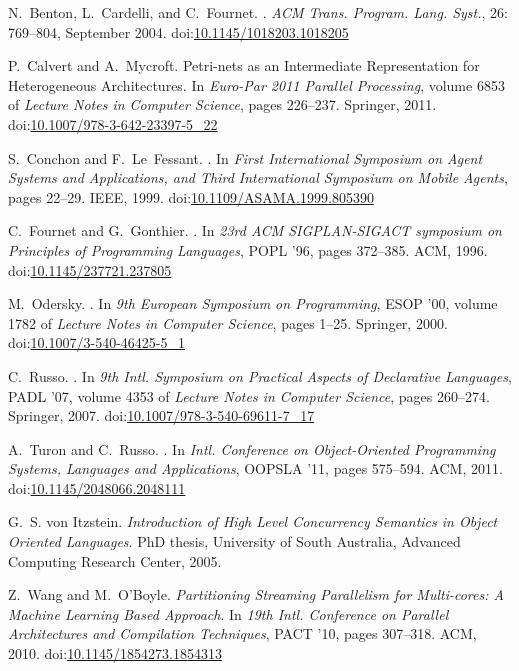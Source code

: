 \documentclass{eptcs}
\providecommand{\urlalt}[2]{\href{#1}{#2}}
\providecommand{\doi}[1]{doi:\urlalt{http://dx.doi.org/#1}{#1}}
\begin{document}
\begin{thebibliography}{7}
N.~Benton, L.~Cardelli, and C.~Fournet.
.
\newblock \emph{ACM Trans. Program. Lang. Syst.}, 26: 769--804,
          September 2004.
          \doi{10.1145/1018203.1018205}

P.~Calvert and A.~Mycroft.
\newblock Petri-nets as an Intermediate Representation for Heterogeneous Architectures.
\newblock In \emph{Euro-Par 2011 Parallel Processing},
          volume 6853 of \emph{Lecture Notes in Computer Science}, pages 226--237. Springer, 2011.
          \doi{10.1007/978-3-642-23397-5\_22}

S.~Conchon and F.~Le~Fessant.
.
\newblock In \emph{First International Symposium on Agent Systems and Applications, and Third International
          Symposium on Mobile Agents}, pages 22--29. IEEE, 1999.
          \doi{10.1109/ASAMA.1999.805390}
  
C.~Fournet and G.~Gonthier.
.
\newblock In \emph{23rd ACM SIGPLAN-SIGACT symposium on Principles of Programming Languages},
          POPL '96, pages 372--385. ACM, 1996.
          \doi{10.1145/237721.237805}

M.~Odersky.
.
\newblock In \emph{9th European Symposium on Programming},
          ESOP '00, volume 1782 of \emph{Lecture Notes in Computer Science}, pages 1--25. Springer, 2000.
          \doi{10.1007/3-540-46425-5\_1}

C.~Russo.
.
\newblock In \emph{9th Intl. Symposium on Practical Aspects of Declarative Languages},
          PADL '07, volume 4353 of \emph{Lecture Notes in Computer Science}, pages 260--274. Springer, 2007.
          \doi{10.1007/978-3-540-69611-7\_17}
          
A.~Turon and C.~Russo.
.
\newblock In \emph{Intl. Conference on Object-Oriented Programming Systems, Languages and Applications},
          OOPSLA '11, pages 575--594. ACM, 2011.
          \doi{10.1145/2048066.2048111}
  
G.~S. von Itzstein.
\newblock \emph{{Introduction of High Level Concurrency Semantics in Object
  Oriented Languages}}.
\newblock PhD thesis, University of South Australia, Advanced Computing
  Research Center, 2005.
  
Z.~Wang and M.~O'Boyle.
\newblock \emph{{Partitioning Streaming Parallelism for Multi-cores: A Machine Learning Based Approach}}.
\newblock In \emph{19th Intl. Conference on Parallel Architectures and Compilation Techniques},
          PACT '10, pages 307--318. ACM, 2010.
          \doi{10.1145/1854273.1854313}

\end{thebibliography}
\end{document}
